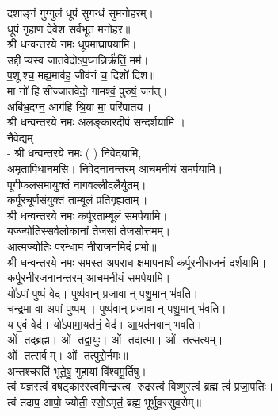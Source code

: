 दशाङ्गं गुग्गुलं धूपं सुगन्धं सुमनोहरम्।\\
धूपं गृहाण देवेश सर्वभूत मनोहर॥ \\
श्री धन्वन्तरये नमः धूपमाघ्रापयामि।\\
 
उद्दीप्यस्व जातवेदोऽप॒घ्नन्निर्ऋ॑तिं॒ मम॑।\\
 प॒शूश्च॒ मह्य॒माव॑ह॒ जीव॑नं च॒ दिशो॑ दिश॥ \\
मा नो॑ हिसीज्जातवेदो॒ गामश्वं॒ पुरु॑षं॒ जग॑त्।\\
अबि॑भ्र॒दग्न॒ आग॑हि श्रि॒या मा॒ परि॑पातय॥ \\
श्री धन्वन्तरये नमः अलङ्कारदीपं सन्दर्शयामि ।\\

नैवेद्यम्\\
- श्री धन्वन्तरये नमः (	) निवेदयामि, \\
अमृतापिधानमसि। निवेदनानन्तरम् आचमनीयं समर्पयामि।\\

पूगीफलसमायुक्तं नागवल्लीदलैर्युतम्।\\
कर्पूरचूर्णसंयुक्तं ताम्बूलं प्रतिगृह्यताम्॥\\
श्री धन्वन्तरये नमः कर्पूरताम्बूलं समर्पयामि।\\

यज्ज्योतिस्सर्वलोकानां तेजसां तेजसोत्तमम्।\\
आत्मज्योतिः परन्धाम नीराजनमिदं प्रभो॥\\
श्री धन्वन्तरये नमः समस्त अपराध क्षमापनार्थं कर्पूरनीराजनं दर्शयामि।\\
कर्पूरनीरजनानन्तरम् आचमनीयं समर्पयामि।\\

 यो॑ऽपां पुष्पं॒ वेद॑। पुष्प॑वान् प्र॒जावान् पशु॒मान् भ॑वति।\\
च॒न्द्रमा॒ वा अ॒पां पुष्पम्। पुष्प॑वान् प्र॒जावान् पशु॒मान् भ॑वति।\\
य ए॒वं वेद॑। यो॑ऽपामा॒यत॑नं॒ वेद॑। आ॒यत॑नवान् भवति।\\

ओं तद्ब्र॒ह्म। ओं तद्वा॒युः। ओं तदा॒त्मा। ओं तत्स॒त्यम्‌।\\
ओं तत्सर्वम्‌। ओं तत्पुरो॒र्नमः॥\\

अन्तश्चरति॑ भूते॒षु॒ गुहायां वि॑श्वमू॒र्तिषु। \\
त्वं यज्ञस्त्वं वषट्कारस्त्वमिन्द्रस्त्व रुद्रस्त्वं विष्णुस्त्वं ब्रह्म त्वं॑ प्रजा॒पतिः। \\
त्वं त॑दाप॒ आपो॒ ज्योती॒ रसो॒ऽमृतं॒ ब्रह्म॒ भूर्भुव॒स्सुव॒रोम्‌॥\\

